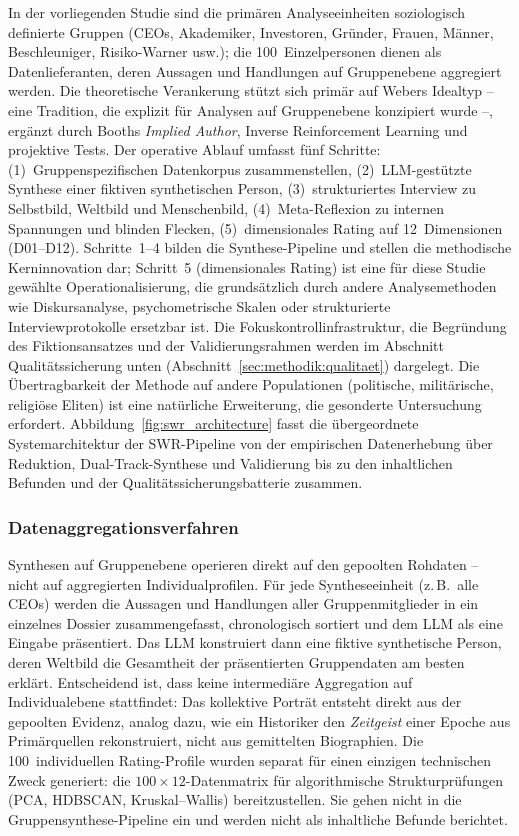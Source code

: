 \documentclass[12pt,a4paper]{article}
\begin{document}
In der vorliegenden Studie sind die primären Analyseeinheiten soziologisch definierte Gruppen (CEOs, Akademiker, Investoren, Gründer, Frauen, Männer, Beschleuniger, Risiko-Warner usw.); die 100~Einzelpersonen dienen als Datenlieferanten, deren Aussagen und Handlungen auf Gruppenebene aggregiert werden. Die theoretische Verankerung stützt sich primär auf Webers Idealtyp -- eine Tradition, die explizit für Analysen auf Gruppenebene konzipiert wurde --, ergänzt durch Booths \emph{Implied Author}, Inverse Reinforcement Learning und projektive Tests. Der operative Ablauf umfasst fünf Schritte: (1)~Gruppenspezifischen Datenkorpus zusammenstellen, (2)~LLM-gestützte Synthese einer fiktiven synthetischen Person, (3)~strukturiertes Interview zu Selbstbild, Weltbild und Menschenbild, (4)~Meta-Reflexion zu internen Spannungen und blinden Flecken, (5)~dimensionales Rating auf 12~Dimensionen (D01--D12). Schritte~1--4 bilden die Synthese-Pipeline und stellen die methodische Kerninnovation dar; Schritt~5 (dimensionales Rating) ist eine für diese Studie gewählte Operationalisierung, die grundsätzlich durch andere Analysemethoden wie Diskursanalyse, psychometrische Skalen oder strukturierte Interviewprotokolle ersetzbar ist. Die Fokuskontrollinfrastruktur, die Begründung des Fiktionsansatzes und der Validierungsrahmen werden im Abschnitt Qualitätssicherung unten (Abschnitt~\ref{sec:methodik:qualitaet}) dargelegt. Die Übertragbarkeit der Methode auf andere Populationen (politische, militärische, religiöse Eliten) ist eine natürliche Erweiterung, die gesonderte Untersuchung erfordert. Abbildung~\ref{fig:swr_architecture} fasst die übergeordnete Systemarchitektur der SWR-Pipeline von der empirischen Datenerhebung über Reduktion, Dual-Track-Synthese und Validierung bis zu den inhaltlichen Befunden und der Qualitätssicherungsbatterie zusammen.

\subsubsection{Datenaggregationsverfahren}

Synthesen auf Gruppenebene operieren direkt auf den gepoolten Rohdaten -- nicht auf aggregierten Individualprofilen. Für jede Syntheseeinheit (z.\,B.~\glqq alle CEOs\grqq) werden die Aussagen und Handlungen aller Gruppenmitglieder in ein einzelnes Dossier zusammengefasst, chronologisch sortiert und dem LLM als eine Eingabe präsentiert. Das LLM konstruiert dann eine fiktive synthetische Person, deren Weltbild die Gesamtheit der präsentierten Gruppendaten am besten erklärt. Entscheidend ist, dass keine intermediäre Aggregation auf Individualebene stattfindet: Das kollektive Porträt entsteht direkt aus der gepoolten Evidenz, analog dazu, wie ein Historiker den \emph{Zeitgeist} einer Epoche aus Primärquellen rekonstruiert, nicht aus gemittelten Biographien. Die 100~individuellen Rating-Profile wurden separat für einen einzigen technischen Zweck generiert: die $100 \times 12$-Datenmatrix für algorithmische Strukturprüfungen (PCA, HDBSCAN, Kruskal--Wallis) bereitzustellen. Sie gehen nicht in die Gruppensynthese-Pipeline ein und werden nicht als inhaltliche Befunde berichtet.
\end{document}
